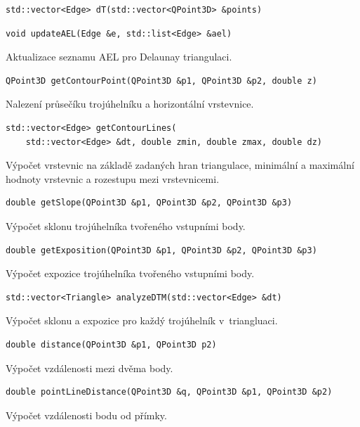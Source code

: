 \documentclass[a4paper, 12pt, oneside, titlepage]{article} %
\begin{document}
\begin{verbatim}
std::vector<Edge> dT(std::vector<QPoint3D> &points)
\end{verbatim}

\begin{verbatim}
void updateAEL(Edge &e, std::list<Edge> &ael)
\end{verbatim}
Aktualizace seznamu AEL pro Delaunay triangulaci.\\

\begin{verbatim}
QPoint3D getContourPoint(QPoint3D &p1, QPoint3D &p2, double z)
\end{verbatim}
Nalezení průsečíku trojúhelníku a horizontální vrstevnice.\\

\begin{verbatim}
std::vector<Edge> getContourLines(
    std::vector<Edge> &dt, double zmin, double zmax, double dz)
\end{verbatim}
Výpočet vrstevnic na základě zadaných hran triangulace, minimální a maximální hodnoty vrstevnic a rozestupu mezi vrstevnicemi.\\

\begin{verbatim}
double getSlope(QPoint3D &p1, QPoint3D &p2, QPoint3D &p3)
\end{verbatim}
Výpočet sklonu trojúhelníka tvořeného vstupními body.\\

\begin{verbatim}
double getExposition(QPoint3D &p1, QPoint3D &p2, QPoint3D &p3)
\end{verbatim}
Výpočet expozice trojúhelníka tvořeného vstupními body.\\

\begin{verbatim}
std::vector<Triangle> analyzeDTM(std::vector<Edge> &dt)
\end{verbatim}
Výpočet sklonu a expozice pro každý trojúhelník v~triangluaci.\\

\begin{verbatim}
double distance(QPoint3D &p1, QPoint3D p2)
\end{verbatim}
Výpočet vzdálenosti mezi dvěma body.\\

\begin{verbatim}
double pointLineDistance(QPoint3D &q, QPoint3D &p1, QPoint3D &p2)
\end{verbatim}
Výpočet vzdálenosti bodu od přímky.\\
\end{document}
